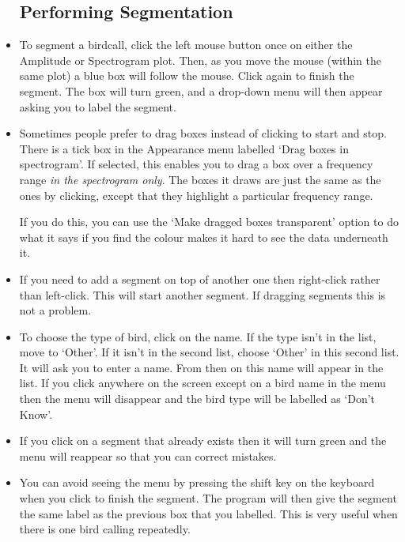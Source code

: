 \documentclass{article}
\begin{document}
\begin{itemize}
\subsection{Performing Segmentation}

\item To segment a birdcall, click the left mouse button once on either the Amplitude or Spectrogram plot. Then, as you move the mouse (within the same plot) a blue box will follow the mouse. Click again to finish the segment. The box will turn green, and a drop-down menu will then appear asking you to label the segment. 

\item Sometimes people prefer to drag boxes instead of clicking to start and stop. There is a tick box in the Appearance menu labelled `Drag boxes in spectrogram'. If selected, this enables you to drag a box over a frequency range {\em in the spectrogram only}. The boxes it draws are just the same as the ones by clicking, except that they highlight a particular frequency range. 

If you do this, you can use the `Make dragged boxes transparent' option to do what it says if you find the colour makes it hard to see the data underneath it.

\item If you need to add a segment on top of another one then right-click rather than left-click. This will start another segment. If dragging segments this is not a problem. 

\item To choose the type of bird, click on the name. If the type isn't in the list, move to `Other'. If it isn't in the second list, choose `Other' in this second list. It will ask you to enter a name. From then on this name will appear in the list. If you click anywhere on the screen except on a bird name in the menu then the menu will disappear and the bird type will be labelled as `Don't Know'.

\item If you click on a segment that already exists then it will turn green and the menu will reappear so that you can correct mistakes.

\item You can avoid seeing the menu by pressing the shift key on the keyboard when you click to finish the segment. The program will then give the segment the same label as the previous box that you labelled. This is very useful when there is one bird calling repeatedly.


\end{itemize}
\end{document}
